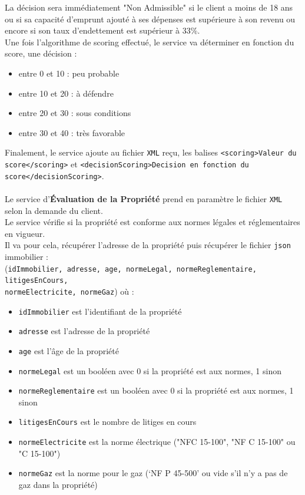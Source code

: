 \documentclass{article}
\begin{document}
	La décision sera immédiatement "Non Admissible" si le client a moins de 18 ans ou si sa capacité d’emprunt ajouté à ses dépenses est supérieure à son revenu ou encore si son taux d’endettement est supérieur à 33\%.\\
	Une fois l’algorithme de scoring effectué, le service va déterminer en fonction du score, une décision : 
	\begin{itemize}
		\item entre 0 et 10 : peu probable
		\item entre 10 et 20 : à défendre
		\item entre 20 et 30 : sous conditions
		\item  entre 30 et 40 : très favorable
	\end{itemize}
	Finalement, le service ajoute au fichier \texttt{XML} reçu, les balises \texttt{<scoring>Valeur du score</scoring>} et \texttt{<decisionScoring>Decision en fonction du score</decisionScoring>}.\\
 \\
	Le service  d'\textbf{Évaluation de la Propriété} prend en paramètre le fichier \texttt{XML} selon la demande du client. \\
	Le service vérifie si la propriété est conforme aux normes légales et réglementaires en vigueur. \\
	Il va pour cela, récupérer l’adresse de la propriété puis récupérer le fichier \texttt{json} immobilier : \\
	(\texttt{idImmobilier, adresse, age, normeLegal, normeReglementaire, litigesEnCours,\\ normeElectricite, normeGaz}) où : 
	\begin{itemize}
		\item \texttt{idImmobilier} est l’identifiant de la propriété
		\item \texttt{adresse} est l’adresse de la propriété
		\item \texttt{age} est l’âge de la propriété
		\item \texttt{normeLegal} est un booléen avec 0 si la propriété est aux normes, 1 sinon
		\item \texttt{normeReglementaire} est un booléen avec 0 si la propriété est aux normes, 1 sinon 
		\item \texttt{litigesEnCours} est le nombre de litiges en cours
		\item \texttt{normeElectricite} est la norme électrique ("NFC 15-100", "NF C 15-100" ou "C 15-100")
		\item \texttt{normeGaz} est la norme pour le gaz (‘NF P 45-500’ ou vide s’il n’y a pas de gaz dans la propriété)
	\end{itemize} 
	
\end{document}
